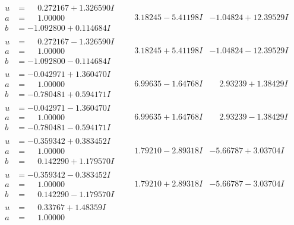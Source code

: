 \documentclass[1p]{elsarticle_modified}
\theoremstyle{definition}
\begin{document}
$$\begin{array}{c|c|c}
\begin{aligned}
u &= \phantom{-}0.272167 + 1.326590 I \\
a &= \phantom{-}1.00000\phantom{ +0.000000I} \\
b &= -1.092800 + 0.114684 I\end{aligned}
 & \phantom{-}3.18245 - 5.41198 I & -1.04824 + 12.39529 I \\ \hline\begin{aligned}
u &= \phantom{-}0.272167 - 1.326590 I \\
a &= \phantom{-}1.00000\phantom{ +0.000000I} \\
b &= -1.092800 - 0.114684 I\end{aligned}
 & \phantom{-}3.18245 + 5.41198 I & -1.04824 - 12.39529 I \\ \hline\begin{aligned}
u &= -0.042971 + 1.360470 I \\
a &= \phantom{-}1.00000\phantom{ +0.000000I} \\
b &= -0.780481 + 0.594171 I\end{aligned}
 & \phantom{-}6.99635 - 1.64768 I & \phantom{-}2.93239 + 1.38429 I \\ \hline\begin{aligned}
u &= -0.042971 - 1.360470 I \\
a &= \phantom{-}1.00000\phantom{ +0.000000I} \\
b &= -0.780481 - 0.594171 I\end{aligned}
 & \phantom{-}6.99635 + 1.64768 I & \phantom{-}2.93239 - 1.38429 I \\ \hline\begin{aligned}
u &= -0.359342 + 0.383452 I \\
a &= \phantom{-}1.00000\phantom{ +0.000000I} \\
b &= \phantom{-}0.142290 + 1.179570 I\end{aligned}
 & \phantom{-}1.79210 - 2.89318 I & -5.66787 + 3.03704 I \\ \hline\begin{aligned}
u &= -0.359342 - 0.383452 I \\
a &= \phantom{-}1.00000\phantom{ +0.000000I} \\
b &= \phantom{-}0.142290 - 1.179570 I\end{aligned}
 & \phantom{-}1.79210 + 2.89318 I & -5.66787 - 3.03704 I \\ \hline\begin{aligned}
u &= \phantom{-}0.33767 + 1.48359 I \\
a &= \phantom{-}1.00000\phantom{ +0.000000I} \\

\end{aligned}
\end{array}$$
\end{document}
